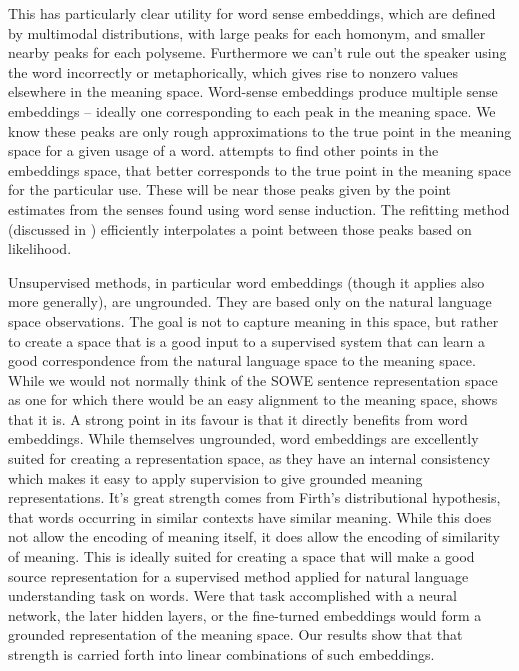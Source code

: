 \documentclass{book}
\begin{document}
This has particularly clear utility for word sense embeddings,
which are defined by multimodal distributions,
with large peaks for each homonym, and smaller nearby peaks for each polyseme.
Furthermore we can't rule out the speaker using the word incorrectly or metaphorically, which gives rise to nonzero values elsewhere in the meaning space.
Word-sense embeddings produce multiple sense embeddings -- ideally one corresponding to each peak in the meaning space.
We know these peaks are only rough approximations to the true point in the meaning space for a given usage of a word.
 attempts to find other points in the embeddings space, that better corresponds to the true point in the meaning space for the particular use.
These will be near those peaks given by the point estimates from the senses found using word sense induction.
The refitting method (discussed in ) efficiently interpolates a point between those peaks based on likelihood.


Unsupervised methods, in particular word embeddings (though it applies also more generally), are ungrounded.
They are based only on the natural language space observations.
The goal is not to capture meaning in this space,
but rather to create a space that is a good input to a supervised system that can learn a good correspondence from the natural language space to the meaning space. 
While we would not normally think of the SOWE sentence representation space as one for which there would be an easy alignment to the meaning space,
 shows that it is.
A strong point in its favour is that it directly benefits from word embeddings.
While themselves ungrounded, word embeddings are excellently suited for creating a representation space, as they have an internal consistency which makes it easy to apply supervision to give grounded meaning representations.
It's great strength comes from Firth's distributional hypothesis, that words occurring in similar contexts have similar meaning.
While this does not allow the encoding of meaning itself, it does allow the encoding of similarity of meaning.
This is ideally suited for creating a space that will make a good source representation for a supervised method applied for natural language understanding task on words.
Were that task accomplished with a neural network, the later hidden layers, or the fine-turned embeddings would form a grounded representation of the meaning space.
Our results show that that strength is carried forth into linear combinations of such embeddings.
\end{document}
